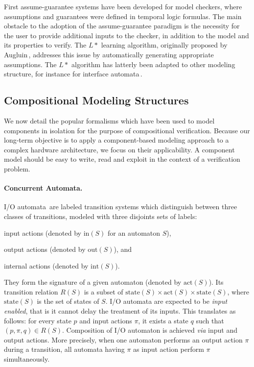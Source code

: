 First assume-guarantee systems have been developed for model checkers, where
assumptions and guarantees were defined in temporal logic formulas.
%
The main obstacle to the adoption of the assume-guarantee paradigm is the
necessity for the user to provide additional inputs to the checker, in addition
to the model and its properties to verify.
%
The \( L* \) learning algorithm, originally proposed by
Augluin\,\cite{angluin1987lstart}, addresses this issue by automatically
generating appropriate assumptions.
%
The \( L* \) algorithm has latterly been adapted to other modeling structure,
for instance for interface automata\,\cite{emmi2008assume}.

\subsection{Compositional Modeling Structures}
\label{subsec:sota:compmod}

We now detail the popular formalisms which have been used to model components in
isolation for the purpose of compositional verification.
%
Because our long-term objective is to apply a component-based modeling approach
to a complex hardware architecture, we focus on their applicability.
%
A component model should be easy to write, read and exploit in the context of a
verification problem.

\paragraph{Concurrent Automata.}
%
I/O automata\,\cite{lynch1988ioautomata} are labeled transition systems which
distinguish between three classes of transitions, modeled with three disjoints
sets of labels:
%
\begin{inparaenum}[(1)]
\item input actions (denoted by \( \mathrm{in}(S) \) for an automaton \( S \)),
\item output actions (denoted by \( \mathrm{out}(S) \)), and
\item internal actions (denoted by \( \mathrm{int}(S) \)).
\end{inparaenum}
%
They form the signature of a given automaton (denoted by \( \mathrm{act}(S) \)).
%
Its transition relation \( R(S) \) is a subset of
\( \mathrm{state}(S) \times \mathrm{act}(S) \times \mathrm{state}(S) \), where
\( \mathrm{state}(S) \) is the set of states of \( S \).
%
I/O automata are expected to be \emph{input enabled}, that is it cannot delay
the treatment of its inputs.
%
This translates as follows: for every state \( p \) and input actions \( \pi \),
it exists a state \( q \) such that \( (p, \pi, q) \in R(S) \).
%
Composition of I/O automaton is achieved \emph{via} input and output actions.
%
More precisely, when one automaton performs an output action \( \pi \) during a
transition, all automata having \( \pi \) as input action perform \( \pi \)
simultaneously.

